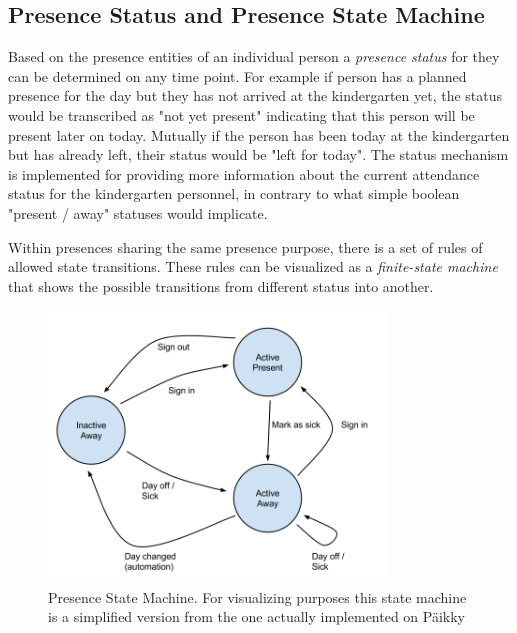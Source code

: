 \subsection{Presence Status and Presence State Machine}
\label{subsec:presencestate}

Based on the presence entities of an individual person a \textit{presence status} for they can be determined on any time point. For example if person has a planned presence for the day but they has not arrived at the kindergarten yet, the status would be transcribed as "not yet present" indicating that this person will be present later on today. Mutually if the person has been today at the kindergarten but has already left, their status would be "left for today". The status mechanism is implemented for providing more information about the current attendance status for the kindergarten personnel, in contrary to what simple boolean "present / away" statuses would implicate.

Within presences sharing the same presence purpose, there is a set of rules of allowed state transitions. These rules can be visualized as a \textit{finite-state machine} that shows the possible transitions from different status into another. 

\begin{figure}[t]
\begin{center}
\includegraphics[width=0.8\textwidth]{assets/statemachine.png}
\end{center}
\caption{Presence State Machine. For visualizing purposes this state machine is a simplified version from the one actually implemented on Päikky}
\label{fig:statemachine}
\end{figure}

